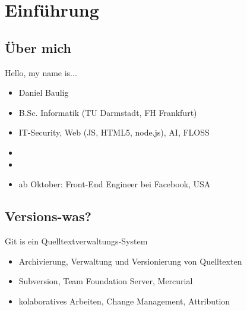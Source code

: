 \newcommand{\command}[1]{\texttt{#1}}
\newcommand{\variable}[1]{\textit{#1}}



\frame{
    \titlepage
}


\section{Einführung}
\subsection{Über mich}

\begin{frame}{Hello, my name is...}
    \begin{itemize}
        \item<1-> Daniel Baulig
        \item<2-> B.Sc. Informatik (TU Darmstadt, FH Frankfurt)
        \item<3-> IT-Security, Web (JS, HTML5, node.js), AI, FLOSS
        \item<4-> 
        \item<5-> 
        \item<7-> ab Oktober: Front-End Engineer bei Facebook, USA
    \end{itemize}

\end{frame}

\subsection{Versions-was?}

\begin{frame}{Git is ein Quelltextverwaltungs-System}
    \begin{itemize}[<+->]
        \item Archivierung, Verwaltung und Versionierung von Quelltexten
        \item Subversion, Team Foundation Server, Mercurial
        \item kolaboratives Arbeiten, Change Management, Attribution
    \end{itemize}
\end{frame}

